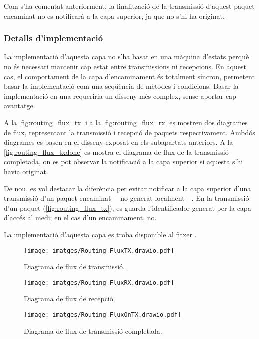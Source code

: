 \documentclass{tfgitic}[2024/07/01]
\begin{document}
{Com s'ha comentat anteriorment, la finalització de la transmissió d'aquest paquet encaminat no es notificarà a la capa superior, ja que no s'hi ha originat.
\subsubsection{Detalls d'implementació}
La implementació d'aquesta capa no s'ha basat en una màquina d'estats perquè no és necessari mantenir cap estat entre transmissions ni recepcions. En aquest cas, el comportament de la capa d'encaminament és totalment síncron, permetent basar la implementació com una seqüència de mètodes i condicions. Basar la implementació en una  requeriria un disseny més complex, sense aportar cap avantatge. 
 
A la \autoref{fig:routing_flux_tx} i a la \autoref{fig:routing_flux_rx} es mostren dos diagrames de flux, representant la transmissió i recepció de paquets respectivament. Ambdós diagrames es basen en el disseny exposat en els subapartats anteriors. A la \autoref{fig:routing_flux_txdone} es mostra el diagrama de flux de la transmissió completada, on es pot observar la notificació a la capa superior si aquesta s'hi havia originat. 

De nou, es vol destacar la diferència per evitar notificar a la capa superior d'una transmissió d'un paquet encaminat ---no generat localment---. En la transmissió d'un paquet (\autoref{fig:routing_flux_tx}), es guarda l'identificador generat per la capa d'accés al medi; en el cas d'un encaminament, no.

La implementació d'aquesta capa es troba disponible al fitxer .

\begin{figure}
    \centering
        \texttt{[image: imatges/Routing\_FluxTX.drawio.pdf]}
    \caption{Diagrama de flux de transmissió.}
    \label{fig:routing_flux_tx}
\end{figure}

\begin{figure}
    \centering
        \texttt{[image: imatges/Routing\_FluxRX.drawio.pdf]}
    \caption{Diagrama de flux de recepció.}
    \label{fig:routing_flux_rx}
\end{figure}

\begin{figure}
    \centering
        \texttt{[image: imatges/Routing\_FluxOnTX.drawio.pdf]}
    \caption{Diagrama de flux de transmissió completada.}
    \label{fig:routing_flux_txdone}
\end{figure}

}
\end{document}
